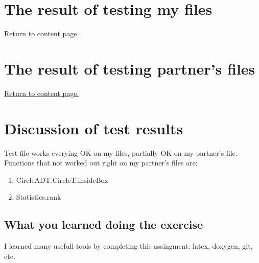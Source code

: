 \documentclass[12pt]{article}
\begin{document}
\section{The result of testing my files}

\newpage

\hyperlink{toc}{Return to content page.}
\section{The result of testing partner's files}

\newpage

\hyperlink{toc}{Return to content page.}
\section{Discussion of test results}
Test file works everying OK on my files, partially OK on my partner's file.
\newline Functions that not worked out right on my partner's files are:
\begin{enumerate}
  \item CircleADT.CircleT.insideBox
  \item Statistics.rank
\end{enumerate}

\subsection{What you learned doing the exercise}
I learned many usefull tools by completing this assingment: latex, doxygen, git, etc.
\end{document}
